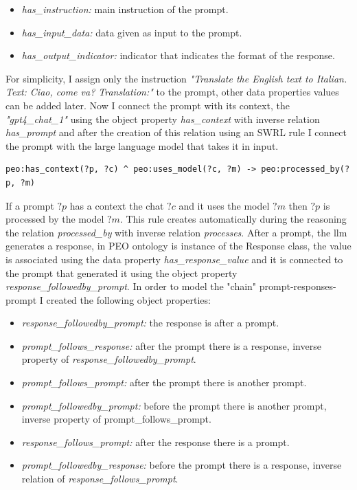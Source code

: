 \begin{itemize}
    \item \textit{has\_instruction:} main instruction of the prompt.

    \item \textit{has\_input\_data:} data given as input to the prompt. 

    \item \textit{has\_output\_indicator:} indicator that indicates the format of the response.
\end{itemize}
For simplicity, I assign only the instruction \textit{"Translate the English text to Italian. Text: Ciao, come va? Translation:"} to the prompt, other data properties values can be added later. Now I connect the prompt with its context, the \textit{"gpt4\_chat\_1"} using the object property \textit{has\_context} with inverse relation \textit{has\_prompt} and after the creation of this relation using an SWRL rule I connect the prompt with the large language model that takes it in input. 
\begin{lstlisting}
peo:has_context(?p, ?c) ^ peo:uses_model(?c, ?m) -> peo:processed_by(?p, ?m)   
\end{lstlisting}
If a prompt $?p$ has a context the chat $?c$ and it uses the model $?m$ then $?p$ is processed by the model $?m$. This rule creates automatically during the reasoning the relation \textit{processed\_by} with inverse relation \textit{processes}. After a prompt, the llm generates a response, in PEO ontology is instance of the Response class, the value is associated using the data property \textit{has\_response\_value} and it is connected to the prompt that generated it using the object property \textit{response\_followedby\_prompt}. In order to model the "chain" prompt-responses-prompt I created the following object properties:
\begin{itemize}
    \item \textit{response\_followedby\_prompt:} the response is after a prompt.

    \item \textit{prompt\_follows\_response:} after the prompt there is a response, inverse property of \textit{response\_followedby\_prompt}.

    \item \textit{prompt\_follows\_prompt:} after the prompt there is another prompt.

    \item \textit{prompt\_followedby\_prompt:} before the prompt there is another prompt, inverse property of {prompt\_follows\_prompt}.

    \item \textit{response\_follows\_prompt:} after the response there is a prompt.

    \item \textit{prompt\_followedby\_response:} before the prompt there is a response, inverse relation of \textit{response\_follows\_prompt}. 
\end{itemize}
